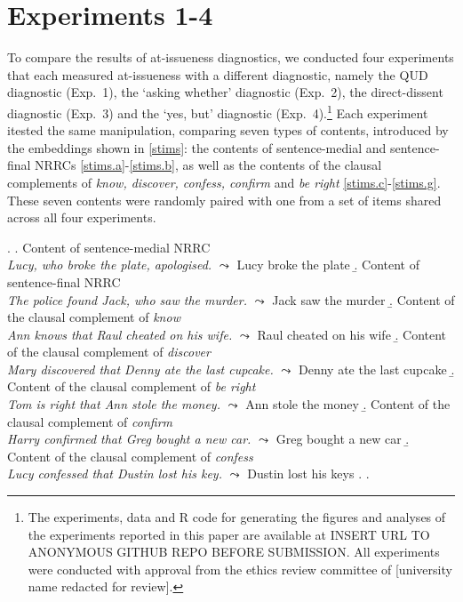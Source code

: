 \documentclass[times,linguex,xcolor]{glossa}
\begin{document}
    
  \newpage


\section{Experiments 1-4 \label{sec:2_experiments}}

  To compare the results of at-issueness diagnostics, we conducted four experiments that each measured at-issueness with a different diagnostic, namely the QUD diagnostic (Exp.~1), the `asking whether' diagnostic (Exp.~2), the direct-dissent diagnostic (Exp.~3) and the `yes, but' diagnostic (Exp.~4).\footnote{The experiments, data and R code for generating the figures and analyses of the experiments reported in this paper are available at INSERT URL TO ANONYMOUS GITHUB REPO BEFORE SUBMISSION. All experiments were conducted with approval from the ethics review committee of [university name redacted for review].}
  Each experiment itested the same manipulation, comparing seven types of contents, introduced by the embeddings shown in \ref{stims}:
  the contents of sentence-medial and sentence-final NRRCs \ref{stims.a}-\ref{stims.b}, as well as the contents of the clausal complements of \emph{know, discover, confess, confirm} and \emph{be right} \ref{stims.c}-\ref{stims.g}. These seven contents were
  randomly paired with one from a set of items shared across all four experiments.


  \ex.\label{stims}
    \a.\label{stims.a} Content of sentence-medial NRRC \\
      \emph{Lucy, who broke the plate, apologised.} $\leadsto$ Lucy broke the plate
    \b.\label{stims.b} Content of sentence-final NRRC \\
    \emph{The police found Jack, who saw the murder.} $\leadsto$ Jack saw the murder
    \b.\label{stims.c} Content of the clausal complement of \emph{know} \\
    \emph{Ann knows that Raul cheated on his wife.} $\leadsto$ Raul cheated on his wife
    \b.\label{stims.d} Content of the clausal complement of \emph{discover} \\
    \emph{Mary discovered that Denny ate the last cupcake.} $\leadsto$ Denny ate the last cupcake
    \b.\label{stims.e} Content of the clausal complement of \emph{be right} \\
    \emph{Tom is right that Ann stole the money.} $\leadsto$ Ann stole the money
    \b.\label{stims.f} Content of the clausal complement of \emph{confirm} \\
    \emph{Harry confirmed that Greg bought a new car.} $\leadsto$ Greg bought a new car
    \b.\label{stims.g} Content of the clausal complement of \emph{confess}  \\
    \emph{Lucy confessed that Dustin lost his key.} $\leadsto$ Dustin lost his keys
    \z.
  \z.
  
\end{document}
